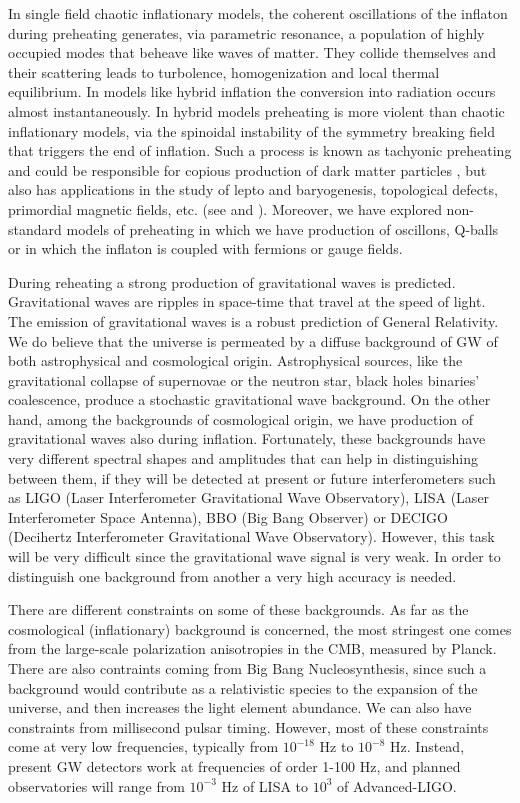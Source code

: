 \documentclass[11pt,a4paper,twoside]{book}
\begin{document}
In single field chaotic inflationary models, the coherent oscillations of the inflaton during preheating generates, via parametric resonance, a population of highly occupied modes that beheave like waves of matter. They collide themselves and their scattering leads to turbolence, homogenization and local thermal equilibrium. In models like hybrid inflation the conversion into radiation occurs almost instantaneously. In hybrid models preheating is more violent than chaotic inflationary models, via the spinoidal instability of the symmetry breaking field that triggers the end of inflation. Such a process is known as tachyonic preheating and could be responsible for copious production of dark matter particles \cite{Conclusion:DarkMatter}, but also has applications in the study of lepto and baryogenesis, topological defects, primordial magnetic fields, etc. (see \cite{Chap4:AminHetrzberg} and \cite{Chap4:Lozanov}). Moreover, we have explored non-standard models of preheating in which we have production of oscillons, Q-balls or in which the inflaton is coupled with fermions or gauge fields.

During reheating a strong production of gravitational waves is predicted. Gravitational waves are ripples in space-time that travel at the speed of light. The emission of gravitational waves is a robust prediction of General Relativity. We do believe that the universe is permeated by a diffuse  background of GW of both astrophysical and cosmological origin. Astrophysical sources, like the gravitational collapse of supernovae or the  neutron star, black holes binaries' coalescence, produce a stochastic gravitational wave background. On the other hand, among the backgrounds of cosmological origin, we have production of gravitational waves also during inflation. Fortunately, these backgrounds have very different spectral shapes and amplitudes that can help in distinguishing between them, if they will be detected at present or future interferometers such as LIGO (Laser Interferometer Gravitational Wave Observatory), LISA (Laser Interferometer Space Antenna), BBO (Big Bang Observer) or DECIGO (Decihertz Interferometer Gravitational Wave Observatory). However, this task will be very difficult since the gravitational wave signal is very weak. In order to distinguish one background from another a very high accuracy is needed.

There are different constraints on some of these backgrounds. As far as the cosmological (inflationary) background is concerned, the most stringest one comes from the large-scale polarization anisotropies in the CMB, measured by Planck. There are also contraints coming from Big Bang Nucleosynthesis, since such a background would contribute as a relativistic species to the expansion of the universe, and then increases the light element abundance. We can also have constraints from millisecond pulsar timing. However, most of these constraints come at very low frequencies, typically from $ 10^{-18} $ Hz to $ 10^{-8} $ Hz. Instead, present GW detectors work at frequencies of order 1-100 Hz, and planned observatories will range from $ 10^{-3} $ Hz of LISA to $ 10^{3} $ of Advanced-LIGO.
\end{document}
